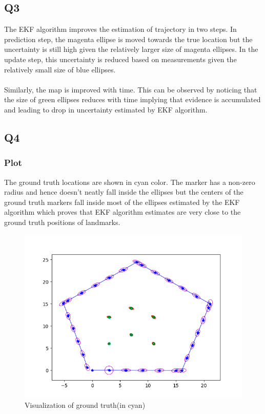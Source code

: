 \documentclass[12pt, a4paper]{article}
\begin{document}
\subsection{Q3}
The EKF algorithm improves the estimation of trajectory in two steps. In prediction step, the magenta ellipse is moved towards the true location but the uncertainty is still high given the relatively larger size of magenta ellipses. In the update step, this uncertainty is reduced based on measurements given the relatively small size of blue ellipses.\\\\
Similarly, the map is improved with time. This can be observed by noticing that the size of green ellipses reduces with time implying that evidence is accumulated and leading to drop in uncertainty estimated by EKF algorithm.
\subsection{Q4}
\subsubsection{Plot}
The ground truth locations are shown in cyan color. The marker has a non-zero radius and hence doesn't neatly fall inside the ellipses but the centers of the ground truth markers fall inside most of the ellipses estimated by the EKF algorithm which proves that EKF algorithm estimates are very close to the ground truth positions of landmarks.
\begin{figure}[H]
  \centering
  \includegraphics[width=1\textwidth]{./results/q2_4/result.png}
  \caption{Visualization of ground truth(in cyan)}
\end{figure}
\end{document}
